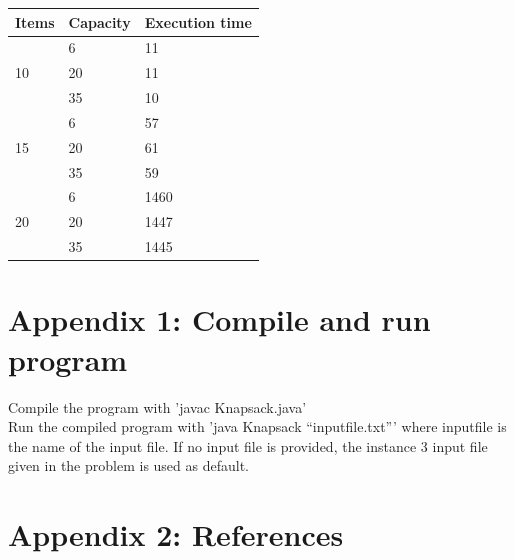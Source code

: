\documentclass{article}
\begin{document}
\begin{tabular}{|l|l|l|} \hline
Items &Capacity &Execution time\\ \hline
\multirow{3}{*}{10} & 6 & 11 \\
& 20 & 11 \\
& 35 & 10 \\ \hline
\multirow{3}{*}{15} & 6 & 57 \\
& 20 & 61 \\
& 35 & 59 \\ \hline
\multirow{3}{*}{20} & 6 & 1460 \\
& 20 & 1447 \\
& 35 & 1445 \\ \hline
\end{tabular}

\section*{Appendix 1: Compile and run program}
\noindent Compile the program with 'javac Knapsack.java'\\ 
\noindent Run the compiled program with 'java Knapsack ``inputfile.txt''' where inputfile is the name of the input file. If no input file is provided, the instance 3 input file given in the problem is used as default. 

\section*{Appendix 2: References}

\end{document}
